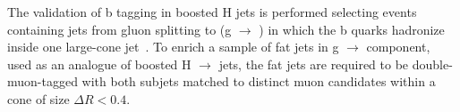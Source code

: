 The validation of b tagging in boosted H jets is performed selecting events containing jets from gluon splitting to \bbbar (g $\to$ \bbbar) in which the b quarks hadronize inside one large-cone jet~\cite{CMS:BTV13001}.
To enrich a sample of fat jets in g $\to$ \bbbar component, used as an analogue of boosted H $\to$ \bbbar jets, the fat jets are required to be double-muon-tagged with both subjets
matched to distinct muon candidates within a cone of size $\Delta R < 0.4$.
